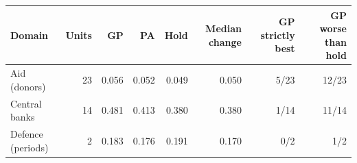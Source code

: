 \begin{tabular}{lrrrrrrr}\toprule
Domain & Units & GP & PA & Hold & Median change & GP strictly best & GP worse than hold\\\midrule
Aid (donors) & 23 & 0.056 & 0.052 & 0.049 & 0.050 & 5/23 & 12/23\\
Central banks & 14 & 0.481 & 0.413 & 0.380 & 0.380 & 1/14 & 11/14\\
Defence (periods) & 2 & 0.183 & 0.176 & 0.191 & 0.170 & 0/2 & 1/2\\
\bottomrule\end{tabular}